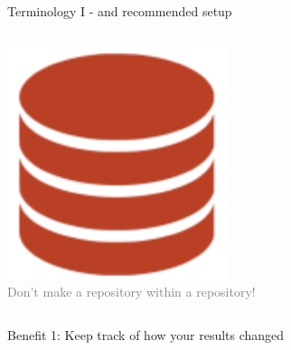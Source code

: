 \documentclass[ignorenonframetext, 10pt, aspectratio=169]{beamer}
\begin{document}
\begin{frame}{Terminology I  - and recommended setup}
\begin{columns}[T]
\begin{column}{0.35\textwidth}
\bigskip
\bigskip
{}\includegraphics[width = 0.25\linewidth]{repo-0.png}\\

\flushright
\textcolor{gray}{\footnotesize Don't make a repository within a repository!}
\end{column}
\end{columns}
\end{frame}

\begin{frame}{Benefit 1: Keep track of how your results changed}
\begin{columns}[T]
\begin{column}{0.18\textwidth}


\end{column}
\end{columns}
\end{frame}
\end{document}
